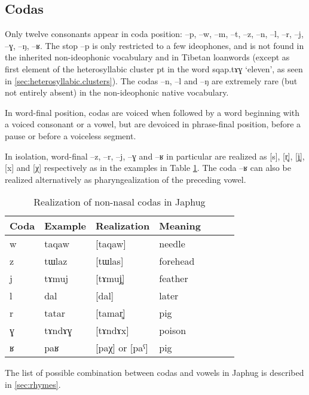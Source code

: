 \documentclass[oldfontcommands,oneside,a4paper,11pt]{article}
\newcommand{\ipa}[1]{{\phon #1}} %
\begin{document}
      \subsection{Codas} \label{sec:coda}
    Only twelve   consonants appear in coda position:  \ipa{--p}, \ipa{--w}, \ipa{--m}, \ipa{--t}, \ipa{--z}, \ipa{--n}, \ipa{--l}, \ipa{--r}, \ipa{--j}, \ipa{--ɣ}, \ipa{--ŋ}, \ipa{--ʁ}. The stop \ipa{--p} is only restricted to a few ideophones, and is not found in the inherited non-ideophonic vocabulary and in Tibetan loanwords (except as first element of the heterosyllabic cluster \ipa{pt} in the word \ipa{sqap.tɤɣ} `eleven', as seen in \ref{sec:heterosyllabic.clusters}). The codas \ipa{--n}, \ipa{--l} and \ipa{--ŋ} are extremely rare (but not entirely absent) in the non-ideophonic native vocabulary. 
    
In word-final position, codas are voiced when followed by a word beginning with a voiced consonant or a vowel, but are devoiced in phrase-final position, before a pause or before a voiceless segment.

In isolation, word-final \ipa{--z}, \ipa{--r}, \ipa{--j}, \ipa{--ɣ} and \ipa{--ʁ} in particular are realized as [s], [r̥], [j̥], [x] and [χ] respectively as in the examples in Table \ref{tab:codas}. The coda \ipa{--ʁ} can also be realized alternatively as pharyngealization of the preceding vowel.

\begin{table}
 \caption{Realization of non-nasal  codas in Japhug} \label{tab:codas}  \centering
\begin{tabular}{lllllll}
\toprule
Coda & Example & Realization &Meaning\\
\midrule
\ipa{w} & \ipa{taqaw} &[taqaw] &needle\\
\ipa{z} & \ipa{tɯlaz} &[tɯlas] &forehead\\
\ipa{j} & \ipa{tɤmuj} &[tɤmuj̥] &feather\\
\ipa{l} & \ipa{dal} &[dal] &later\\
\ipa{r} & \ipa{tatar} &[tamar̥] &pig\\
\ipa{ɣ} & \ipa{tɤndɤɣ} &[tɤndɤx] &poison\\
\ipa{ʁ} & \ipa{paʁ} & [paχ] or [paˁ] &pig\\
\bottomrule
\end{tabular}
\end{table}
    
    
    The list of possible combination between codas and vowels in Japhug is described in \ref{sec:rhymes}.
    
\end{document}
